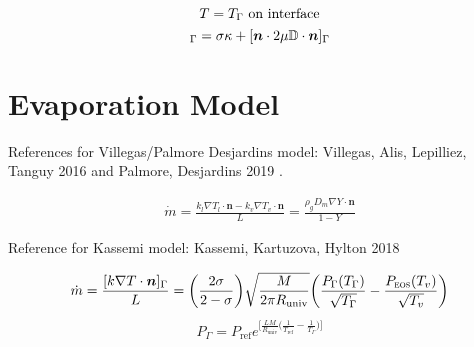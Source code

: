 \documentclass[]{article}
\begin{document}
\begin{mymathbox}[title=Interface Conditions, colframe=blue!50!black]
			
\begin{equation}
T = T_\Gamma\textrm{ on interface}\\
\end{equation}
\begin{equation}
[p]_\Gamma = \sigma\kappa + [\bm{n}\cdot 2\mu\mathbb{D}\cdot\bm{n}]_\Gamma\\
\end{equation}
\end{mymathbox}
	
	
\section*{Evaporation Model} 

References for Villegas/Palmore Desjardins model: 
Villegas, Alis, Lepilliez, Tanguy 2016 \cite{VILLEGAS2016} and
Palmore, Desjardins 2019 \cite{PALMORE2019}. 
\begin{mymathbox}[title=Villegas/Palmore Desjardins , colframe=blue!50!black]
		
\begin{eqnarray*}
\dot{m}= \frac{k_l\nabla T_l\cdot \bm{n} - 
k_v\nabla T_v\cdot \bm{n}}{L}= \frac{\rho_g D_m \nabla Y \cdot \bm{n}}{1-Y} 
\end{eqnarray*}
\end{mymathbox}

Reference for Kassemi model: Kassemi, Kartuzova, 
Hylton 2018 \cite{KASSEMI2018}
\begin{mymathbox}[title=Kassemi, colframe=blue!50!black]
\small
\begin{eqnarray*}
\dot{m} = \frac{[k\nabla T\cdot \bm{n}]_\Gamma}{L} = 
\bigg(\frac{2\sigma}{2-\sigma}\bigg)
\sqrt{\frac{M}{2\pi R_{\textrm{univ}}} }
\bigg(\frac{P_\Gamma(T_\Gamma)}
{\sqrt{T_\Gamma}} - \frac{P_{\textsc{eos}}(T_v)}{\sqrt{T_v}}\bigg)
\end{eqnarray*}
\begin{eqnarray*}
P_\Gamma=
P_{\textrm{ref}}e^{\big[\frac{LM}{R_{\textrm{univ}}}
\big(\frac{1}{T_{\textrm{ref}}} - \frac{1}{T_\Gamma}\big) \big]}
\end{eqnarray*}
\end{mymathbox}
	
\end{document}
